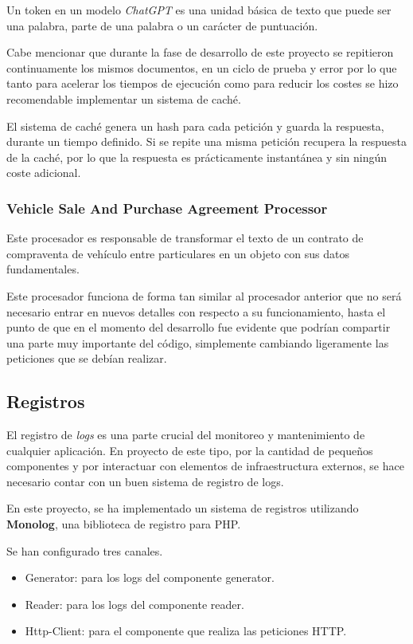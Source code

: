 Un token en un modelo \textit{ChatGPT} es una unidad básica de texto que puede ser una palabra, parte de una palabra
o un carácter de puntuación.

Cabe mencionar que durante la fase de desarrollo de este proyecto se repitieron continuamente los mismos documentos,
en un ciclo de prueba y error por lo que tanto para acelerar los tiempos de ejecución como para reducir los costes se
hizo recomendable implementar un sistema de caché.

El sistema de caché genera un hash para cada petición y guarda la respuesta, durante un tiempo definido.
Si se repite una misma petición recupera la respuesta de la caché, por lo que la respuesta es prácticamente
instantánea y sin ningún coste adicional.

\subsubsection{Vehicle Sale And Purchase Agreement Processor}

Este procesador es responsable de transformar el texto de un contrato de compraventa de vehículo entre particulares en
un objeto con sus datos fundamentales.

Este procesador funciona de forma tan similar al procesador anterior que no será necesario entrar en nuevos detalles
con respecto a su funcionamiento, hasta el punto de que en el momento del desarrollo fue evidente que podrían
compartir una parte muy importante del código, simplemente cambiando ligeramente las peticiones que se debían realizar.

\subsection{Registros}

El registro de \textit{logs} es una parte crucial del monitoreo y mantenimiento de cualquier aplicación.
En proyecto de este tipo, por la cantidad de pequeños componentes y por interactuar con elementos de infraestructura
externos, se hace necesario contar con un buen sistema de registro de logs.

En este proyecto, se ha implementado un sistema de registros utilizando \textbf{Monolog}, una biblioteca de registro
para PHP.

Se han configurado tres canales.

\begin{itemize}
    \item Generator: para los logs del componente generator.
    \item Reader: para los logs del componente reader.
    \item Http-Client: para el componente que realiza las peticiones HTTP.
\end{itemize}

